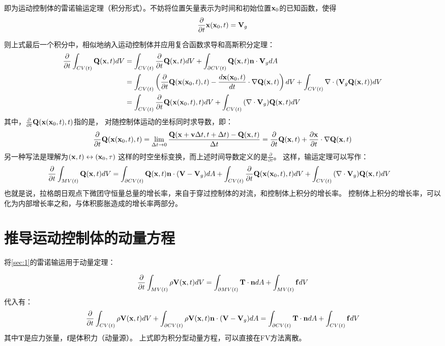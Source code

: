 \documentclass[UTF8,zihao=5]{ctexart} %
\newcommand{\bm}[1]{{\mathbf{#1}}}
\newcommand*{\pd}[2]{\frac{\partial #1}{\partial #2}}
\newcommand*{\inc}[0]{{\Delta}}
\newcommand*{\vv}[0]{\bm{v}}
\newcommand*{\nb}[0]{{\nabla}}
\begin{document}
即为运动控制体的雷诺输运定理（积分形式）。不妨将位置矢量表示为时间和初始位置$\xx_0$的已知函数，使得
$$
    \pd{}{t}\xx(\xx_0,t)=\V_g
$$

则上式最后一个积分中，相似地纳入运动控制体并应用复合函数求导和高斯积分定理：
$$
    \begin{aligned}
        \pd{}{t}\int_{CV(t)}{
            \Q(\xx,t) dV
        }
         & =
        \int_{CV(t)}{
            \pd{}{t}\Q(\xx,t) dV
        }
        +
        \int_{\partial CV(t)}{
            \Q(\xx,t) \nn\cdot\V_g dA
        }
        \\&=
        \int_{CV(t)}{\left(
            \pd{}{t}\Q(\xx(\xx_0,t),t) -
            \frac{d\xx(\xx_0,t)}{dt}\cdot\nb\Q(\xx,t)
            \right)dV
        }
        +
        \int_{CV(t)}{
            \nb\cdot(\V_g\Q(\xx,t)) dV
        }    \\
         & =
        \int_{CV(t)}{
            \pd{}{t}\Q(\xx(\xx_0,t),t) dV
        }
        +
        \int_{CV(t)}{
            (\nabla\cdot\V_g)\Q(\xx,t) dV
        }
    \end{aligned}
$$
其中，$\pd{}{t}\Q(\xx(\xx_0,t),t)$指的是，
对随控制体运动的坐标同时求导数，即：
$$
\pd{}{t}\Q(\xx(\xx_0,t),t)
=\lim_{\inc t\rightarrow 0}
\frac{\Q(\xx+\vv\inc t, t + \inc t)-\Q(\xx, t)}{\inc t}
=\pd{}{t}\Q(\xx,t)+\pd{\xx}{t}\cdot\nb\Q(\xx,t)
$$
另一种写法是理解为$(\xx,t)\leftrightarrow(\xx_0,\tau)$
这样的时空坐标变换，而上述时间导数定义的是$\pd{}{\tau}$。
这样，输运定理可以写作：
\begin{equation}
    \begin{aligned}
        \pd{}{t}\int_{MV(t)}{
            \Q(\xx,t) dV
        }
         & =
        \int_{\partial CV(t)}{
            \Q(\xx,t) \nn \cdot (\V-\V_g) dA
        }
        +
        \int_{CV(t)}{
            \pd{}{t}\Q(\xx(\xx_0,t),t) dV
        }
        +
        \int_{CV(t)}{
            (\nabla\cdot\V_g)\Q(\xx,t) dV
        }
    \end{aligned}
\end{equation}
也就是说，拉格朗日观点下微团守恒量总量的增长率，来自于穿过控制体的对流，和控制体上积分的增长率。
控制体上积分的增长率，可以化为内部增长率之和，与体积膨胀造成的增长率两部分。

\section{推导运动控制体的动量方程}
将\ref{sec:1}的雷诺输运用于动量定理：

\begin{equation}
    \pd{}{t}\int_{MV(t)}{
        \rho\V(\xx,t) dV
    }=
    \int_{\partial MV(t)}{\bm{T}\cdot\nn dA} +
    \int_{MV(t)}{\bm{f} dV}
\end{equation}
代入有：
\begin{equation}
    \pd{}{t}\int_{CV(t)}{
        \rho\V(\xx,t) dV
    }
    +
    \int_{\partial CV(t)}{
        \rho\V(\xx,t) \nn \cdot (\V-\V_g) dA
    }
    =
    \int_{\partial CV(t)}{\bm{T}\cdot\nn dA} +
    \int_{CV(t)}{\bm{f} dV}
\end{equation}
其中$\bm{T}$是应力张量，$\bm{f}$是体积力（动量源）。
上式即为积分型动量方程，可以直接在FV方法离散。
\end{document}
